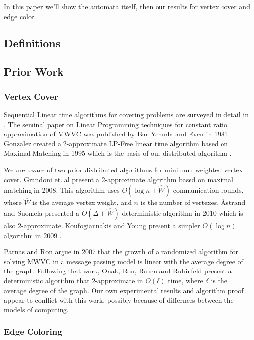 \documentclass[twoside]{article}
\begin{document}
In this paper we'll show the automata itself, then our results for vertex cover and edge color.

\subsection{Definitions}





\subsection{Prior Work}

\subsubsection{Vertex Cover}

Sequential Linear time algorithms for covering problems are surveyed in detail in \cite{254190}. The seminal paper on Linear Programming techniques for constant ratio approximation of MWVC was published by Bar-Yehuda and Even in 1981 \cite{Bar-Yehuda:1981lr}. Gonzalez created a 2-approximate LP-Free linear time algorithm based on Maximal Matching in 1995 which is the basis of our distributed algorithm \cite{Gonzalez1995129}. 

We are aware of two prior distributed algorithms for minimum weighted vertex cover. Grandoni et. al present a 2-approximate algorithm based on maximal matching in 2008\cite{1435381}. This algorithm uses $O(\log n + \hat{W})$ communication rounds, where $\hat{W}$ is the average vertex weight, and $n$ is the number of vertexes. {\AA}strand and Suomela presented a $O(\Delta + \hat{W})$ deterministic algorithm in 2010 which is also 2-approximate. Koufogiannakis and Young present a simpler $O(\log n)$ algorithm in 2009 \cite{1582746}. 

Parnas and Ron argue in 2007 that the growth of a randomized algorithm for solving MWVC in a message passing model is linear with the average degree of the graph\cite{Parnas:2007:AMV:1280283.1280327}. Following that work, Onak, Ron, Rosen and Rubinfeld present a deterministic algorithm that 2-approximate in $O(\delta)$ time, where $\delta$ is the average degree of the graph\cite{Onak:2012:NSA:2095116.2095204}. Our own experimental results and algorithm proof appear to conflict with this work, possibly because of differnces between the models of computing. 

\subsubsection{Edge Coloring}
\end{document}
